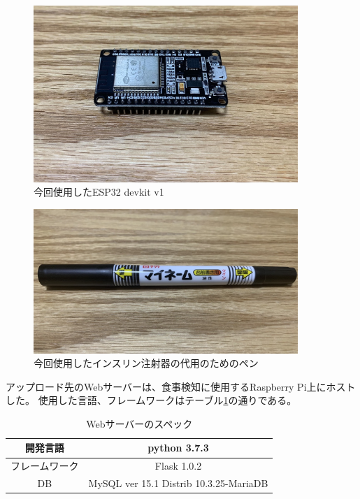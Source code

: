 \begin{figure}[htbp]
  \caption{今回使用したESP32 devkit v1}
  \label{fig:esp32}
  \begin{center}
    \includegraphics[bb=0 0 1300 1100,width=10cm]{assets/esp32.jpg}
  \end{center}
\end{figure}

\begin{figure}[htbp]
  \caption{今回使用したインスリン注射器の代用のためのペン}
  \label{fig:insulin_pen}
  \begin{center}
    \includegraphics[bb=0 0 1400 900,width=10cm]{assets/pen.jpg}
  \end{center}
\end{figure}


アップロード先のWebサーバーは、食事検知に使用するRaspberry Pi上にホストした。
使用した言語、フレームワークはテーブル\ref{tb:web_server}の通りである。

\begin{table}[htbp]
  \caption{Webサーバーのスペック}
  \label{tb:web_server}
  \begin{center}
    \begin{tabular}{|c||c|}
      \hline
      開発言語  & python 3.7.3 \\\hline
      フレームワーク  & Flask 1.0.2 \\\hline
      DB & MySQL ver 15.1 Distrib 10.3.25-MariaDB \\\hline
    \end{tabular}
  \end{center}
\end{table}

